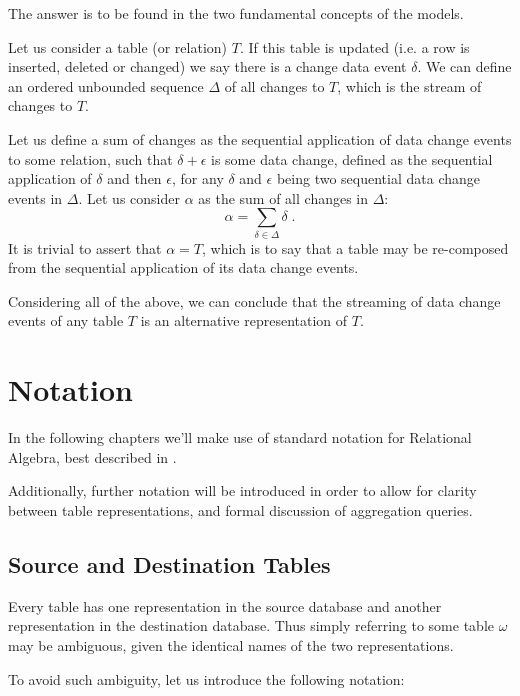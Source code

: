 The answer is to be found in the two fundamental concepts of the models.

Let us consider a table (or relation) $T$.
If this table is updated (i.e. a row is inserted, deleted or changed) we say there is a change data event $\delta$.
We can define an ordered unbounded sequence $\Delta$ of all changes to $T$, which is the stream of changes to $T$.

Let us define a sum of changes as the sequential application of data change events to some relation, such that $\delta + \epsilon$ is some data change, defined as the sequential application of $\delta$ and then $\epsilon$, for any $\delta$ and $\epsilon$ being two sequential data change events in $\Delta$.
Let us consider $\alpha$ as the sum of all changes in $\Delta$:
$$
\alpha = \sum_{\delta \in \Delta} \delta \; .
$$
It is trivial to assert that $ \alpha = T $, which is to say that a table may be re-composed from the sequential application of its data change events.

Considering all of the above, we can conclude that the streaming of data change events of any table $ T $ is an alternative representation of $ T $.


\section{Notation}

In the following chapters we'll make use of standard notation for Relational Algebra, best described in \cite[Chapter 4]{dbms}.

Additionally, further notation will be introduced in order to allow for clarity between table representations, and formal discussion of aggregation queries.


\subsection{Source and Destination Tables}

Every table has one representation in the source database and another representation in the destination database.
Thus simply referring to some table $\omega$ may be ambiguous, given the identical names of the two representations.

To avoid such ambiguity, let us introduce the following notation:

